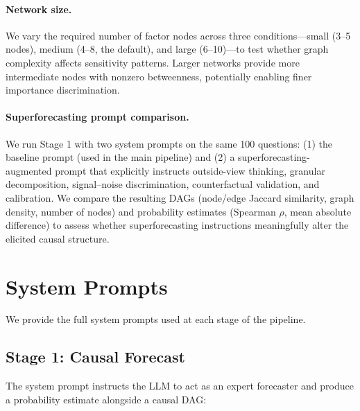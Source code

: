 \documentclass[11pt]{article}
\begin{document}
\paragraph{Network size.} We vary the required number of factor nodes across three conditions---small (3--5 nodes), medium (4--8, the default), and large (6--10)---to test whether graph complexity affects sensitivity patterns. Larger networks provide more intermediate nodes with nonzero betweenness, potentially enabling finer importance discrimination.

\paragraph{Superforecasting prompt comparison.} We run Stage 1 with two system prompts on the same 100 questions: (1) the baseline prompt (used in the main pipeline) and (2) a superforecasting-augmented prompt that explicitly instructs outside-view thinking, granular decomposition, signal--noise discrimination, counterfactual validation, and calibration. We compare the resulting DAGs (node/edge Jaccard similarity, graph density, number of nodes) and probability estimates (Spearman $\rho$, mean absolute difference) to assess whether superforecasting instructions meaningfully alter the elicited causal structure.

\appendix

\section{System Prompts}
\label{app:prompts}

We provide the full system prompts used at each stage of the pipeline.

\subsection{Stage 1: Causal Forecast}
\label{app:prompt-forecast}

The system prompt instructs the LLM to act as an expert forecaster and produce a probability estimate alongside a causal DAG:
\end{document}
